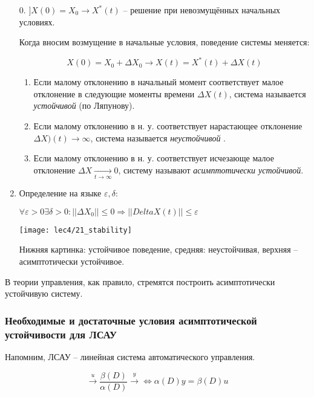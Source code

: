 \documentclass[main.tex]{subfiles}
\begin{document}
\begin{enumerate}
    \item[0.] $ ] X(0) = X_0 \to  X^*(t) $ -- решение при невозмущённых начальных условиях.

    Когда вносим возмущение в начальные условия, поведение системы меняется:

    \[ X(0) = X_0 + \Delta X_0 \to X(t) = X^*(t) + \Delta X(t) \]

    \begin{enumerate}[noitemsep]
        \item Если малому отклонению в начальный момент соответствует малое отклонение в следующие моменты времени $ \Delta X(t) $, система называется \emph{ устойчивой } (по Ляпунову).

        \item Если малому отклонению в н. у. соответствует нарастающее отклонение $ \Delta X)(t) \to \infty $, система называется \emph{ неустойчивой }.

        \item Если малому отклонению в н. у. соответствует исчезающе малое отклонение $ \Delta X \xrightarrow[t \to \infty]{} 0 $, систему называют \emph{асимптотически устойчивой}.
    \end{enumerate}

    \item Определение на языке $\varepsilon, \delta$:

    $ \forall \varepsilon > 0 \exists \delta > 0 : ||\Delta X_0|| \le 0 \Rightarrow ||Delta X(t)|| \le \varepsilon $

    \texttt{[image: lec4/21\_stability]}

    Нижняя картинка: устойчивое поведение, средняя: неустойчивая, верхняя -- асимптотически устойчивое.
\end{enumerate}

В теории управления, как правило, стремятся построить асимптотически устойчивую систему.

\subsubsection{Необходимые и достаточные условия асимптотической устойчивости для ЛСАУ}

Напомним, ЛСАУ -- линейная система автоматического управления.

$$ \xrightarrow{u} \boxed{\frac{\beta(D)}{\alpha(D)}} \xrightarrow{y} \Leftrightarrow \alpha(D)y=\beta(D)u $$
\end{document}
